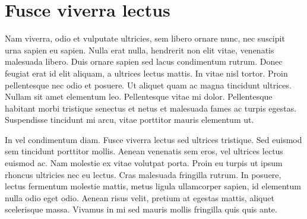 \chapter{Fusce viverra lectus}\label{app:one}


Nam viverra, odio et vulputate ultricies, sem libero ornare nunc, nec suscipit urna sapien eu sapien. Nulla erat nulla, hendrerit non elit vitae, venenatis malesuada libero. Duis ornare sapien sed lacus condimentum rutrum. Donec feugiat erat id elit aliquam, a ultrices lectus mattis. In vitae nisl tortor. Proin pellentesque nec odio et posuere. Ut aliquet quam ac magna tincidunt ultrices. Nullam sit amet elementum leo. Pellentesque vitae mi dolor. Pellentesque habitant morbi tristique senectus et netus et malesuada fames ac turpis egestas. Suspendisse tincidunt mi arcu, vitae porttitor mauris elementum ut.\par

In vel condimentum diam. Fusce viverra lectus sed ultrices tristique. Sed euismod sem tincidunt porttitor mollis. Aenean venenatis sem eros, vel ultrices lectus euismod ac. Nam molestie ex vitae volutpat porta. Proin eu turpis ut ipsum rhoncus ultricies nec eu lectus. Cras malesuada fringilla rutrum. In posuere, lectus fermentum molestie mattis, metus ligula ullamcorper sapien, id elementum nulla odio eget odio. Aenean risus velit, pretium at egestas mattis, aliquet scelerisque massa. Vivamus in mi sed mauris mollis fringilla quis quis ante. 